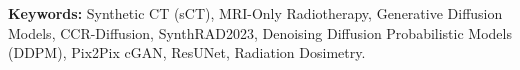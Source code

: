\documentclass[12pt,a4paper]{report}
\begin{document}
\vspace{15pt}
\noindent \textbf{Keywords:} Synthetic CT (sCT), MRI-Only Radiotherapy, Generative Diffusion Models, CCR-Diffusion, SynthRAD2023, Denoising Diffusion Probabilistic Models (DDPM), Pix2Pix cGAN, ResUNet, Radiation Dosimetry.

\newpage
\tableofcontents

\newpage
\listoffigures

\newpage
\listoftables

\newpage
{}
\setcounter{page}{1}
\pagestyle{vtu}













\newpage


\end{document}
